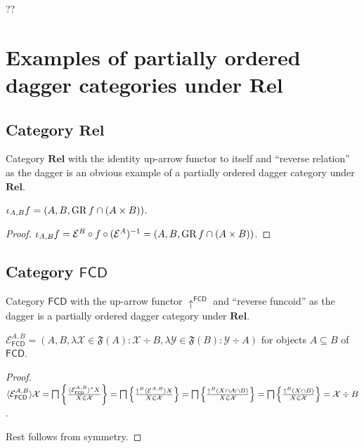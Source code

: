 ??

\section{\texorpdfstring{Examples of partially ordered dagger categories under
$\mathbf{Rel}$}{Examples of partially ordered dagger categories under Rel}}

\subsection{\texorpdfstring{Category $\mathbf{Rel}$}{Category Rel}}

Category $\mathbf{Rel}$ with the identity up-arrow functor to itself
and ``reverse relation'' as the dagger is an obvious example of a partially
ordered dagger category under $\mathbf{Rel}$.

\begin{prop}
  $\iota_{A, B} f = (A , B , \operatorname{GR} f \cap (A \times B))$.
\end{prop}

\begin{proof}
  $\iota_{A, B} f = \mathcal{E}^{B} \circ f \circ (\mathcal{E}^{A})^{-1} = (A , B , \operatorname{GR} f \cap (A \times B))$.
\end{proof}

\subsection{\texorpdfstring{Category $\mathsf{FCD}$}{Category FCD}}

Category $\mathsf{FCD}$ with the up-arrow functor
$\uparrow^{\mathsf{FCD}}$ and ``reverse funcoid'' as the dagger is a
partially ordered dagger category under $\mathbf{Rel}$.

\begin{prop}
  $\mathcal{E}_{\mathsf{FCD}}^{A,B} = (A , B , \lambda \mathcal{X}
  \in \mathfrak{F} (A) : \mathcal{X} \div B , \lambda \mathcal{Y} \in
  \mathfrak{F} (B) : \mathcal{Y} \div A)$ for objects $A \subseteq B$ of
  $\mathsf{FCD}$.
\end{prop}

\begin{proof}
  $\langle \mathcal{E}_{\mathsf{FCD}}^{A,B} \rangle \mathcal{X} =
  \bigsqcap \left\{ \frac{ \langle \mathcal{E}_{\mathsf{FCD}}^{A,B}
  \rangle^{\ast} X }{ X \in \mathcal{X} }\right\} =
  \bigsqcap \left\{ \frac{ \uparrow^B  \langle \mathcal{E}^{A,B} \rangle X
  }{ X \in \mathcal{X} }\right\} = \bigsqcap \left\{ \frac{
  \uparrow^B  (X \cap A \cap B) }{ X \in \mathcal{X}
  }\right\} = \bigsqcap \left\{ \frac{ \uparrow^B  (X \cap B) }{
  X \in \mathcal{X} }\right\} = \mathcal{X} \div B$.
  
  Rest follows from symmetry.
\end{proof}

